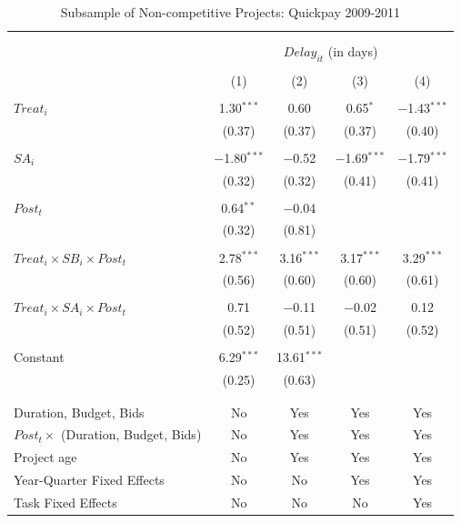 \documentclass[
]{article}
\begin{document}
\begin{table}[H] \centering 
  \caption{Subsample of Non-competitive Projects: Quickpay 2009-2011} 
  \label{} 
\small 
\begin{tabular}{@{\extracolsep{-2pt}}lcccc} 
\\[-1.8ex]\hline 
\hline \\[-1.8ex] 
\\[-1.8ex] & \multicolumn{4}{c}{$Delay_{it}$ (in days)} \\ 
\\[-1.8ex] & (1) & (2) & (3) & (4)\\ 
\hline \\[-1.8ex] 
 $Treat_i$ & 1.30$^{***}$ & 0.60 & 0.65$^{*}$ & $-$1.43$^{***}$ \\ 
  & (0.37) & (0.37) & (0.37) & (0.40) \\ 
  & & & & \\ 
 $SA_i$ & $-$1.80$^{***}$ & $-$0.52 & $-$1.69$^{***}$ & $-$1.79$^{***}$ \\ 
  & (0.32) & (0.32) & (0.41) & (0.41) \\ 
  & & & & \\ 
 $Post_t$ & 0.64$^{**}$ & $-$0.04 &  &  \\ 
  & (0.32) & (0.81) &  &  \\ 
  & & & & \\ 
 $Treat_i \times SB_i \times Post_t$ & 2.78$^{***}$ & 3.16$^{***}$ & 3.17$^{***}$ & 3.29$^{***}$ \\ 
  & (0.56) & (0.60) & (0.60) & (0.61) \\ 
  & & & & \\ 
 $Treat_i \times SA_i \times Post_t$ & 0.71 & $-$0.11 & $-$0.02 & 0.12 \\ 
  & (0.52) & (0.51) & (0.51) & (0.52) \\ 
  & & & & \\ 
 Constant & 6.29$^{***}$ & 13.61$^{***}$ &  &  \\ 
  & (0.25) & (0.63) &  &  \\ 
  & & & & \\ 
\hline \\[-1.8ex] 
Duration, Budget, Bids & No & Yes & Yes & Yes \\ 
$Post_t \times $  (Duration, Budget, Bids) & No & Yes & Yes & Yes \\ 
Project age & No & Yes & Yes & Yes \\ 
Year-Quarter Fixed Effects & No & No & Yes & Yes \\ 
Task Fixed Effects & No & No & No & Yes \\ 

\end{tabular}
\end{table}
\end{document}

